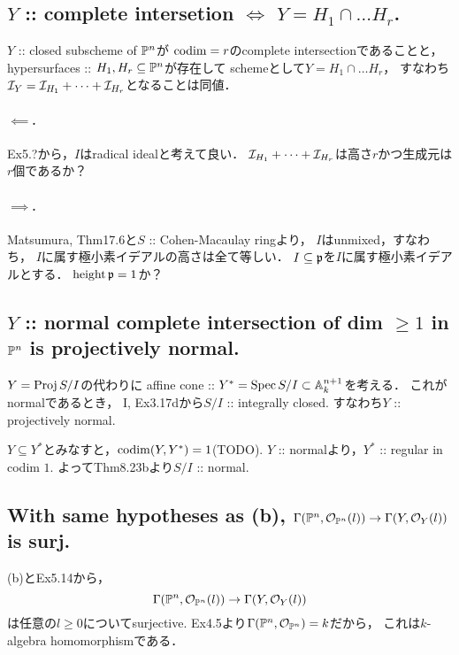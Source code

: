 \documentclass[a4paper]{jsarticle}
\begin{document}
    \subsection{$Y$ :: complete intersetion $\iff$ $Y=H_1\cap\dots H_r$.}
    $Y$ :: closed subscheme of $\mathbb{P}^n$が
    $\operatorname{codim}=r$のcomplete intersectionであることと，
    hypersurfaces :: $H_1, H_r \subseteq \mathbb{P}^n$が存在して
    schemeとして$Y=H_1\cap\dots H_r$，
    すなわち$\mathcal{I}_Y=\mathcal{I}_{H_1}+\dots+\mathcal{I}_{H_r}$となることは同値．

    \paragraph{$\impliedby$.}
    Ex5.?から，$I$はradical idealと考えて良い．
    $\mathcal{I}_{H_1}+\dots+\mathcal{I}_{H_r}$は高さ$r$かつ生成元は$r$個であるか？

    \paragraph{$\implies$.}
    Matsumura, Thm17.6と$S$ :: Cohen-Macaulay ringより，
    $I$はunmixed，すなわち，
    $I$に属す極小素イデアルの高さは全て等しい．
    $I \subseteq \mathfrak{p}$を$I$に属す極小素イデアルとする．
    $\operatorname{height} \mathfrak{p}=1$か？


    \subsection{$Y$ :: normal complete intersection of dim $ \geq 1$ in $\mathbb{P}^n$ is projectively normal.}
    $Y=\operatorname{Proj} S/I$の代わりに
    affine cone :: $Y^{*}=\operatorname{Spec} S/I \subset \mathbb{A}^{n+1}_k$を考える．
    これがnormalであるとき，
    I, Ex3.17dから$S/I$ :: integrally closed.
    すなわち$Y$ :: projectively normal.

    $Y \subseteq Y^*$とみなすと，$\operatorname{codim}(Y, Y^*)=1$(TODO).
    $Y$ :: normalより，$Y^*$ :: regular in codim $1$.
    よってThm8.23bより$S/I$ :: normal.

    \subsection{With same hypotheses as (b), 
        $\Gamma(\mathbb{P}^n, \mathcal{O}_{\mathbb{P}^n}(l)) \to \Gamma(Y, \mathcal{O}_Y(l))$ is surj.}
    (b)とEx5.14から，
    \[ \Gamma(\mathbb{P}^n, \mathcal{O}_{\mathbb{P}^n}(l)) \to \Gamma(Y, \mathcal{O}_Y(l)) \]
    は任意の$l \geq 0$についてsurjective.
    Ex4.5より$\Gamma(\mathbb{P}^n, \mathcal{O}_{\mathbb{P}^n})=k$だから，
    これは$k$-algebra homomorphismである．
\end{document}
